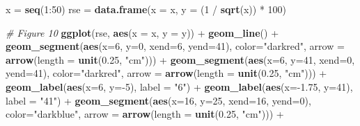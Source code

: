 \documentclass[]{book}
\newenvironment{Shaded}{\begin{snugshade}}{\end{snugshade}}
\newcommand{\KeywordTok}[1]{\textcolor[rgb]{0.13,0.29,0.53}{\textbf{{#1}}}}
\newcommand{\DataTypeTok}[1]{\textcolor[rgb]{0.13,0.29,0.53}{{#1}}}
\newcommand{\DecValTok}[1]{\textcolor[rgb]{0.00,0.00,0.81}{{#1}}}
\newcommand{\FloatTok}[1]{\textcolor[rgb]{0.00,0.00,0.81}{{#1}}}
\newcommand{\StringTok}[1]{\textcolor[rgb]{0.31,0.60,0.02}{{#1}}}
\newcommand{\CommentTok}[1]{\textcolor[rgb]{0.56,0.35,0.01}{\textit{{#1}}}}
\newcommand{\NormalTok}[1]{{#1}}
\begin{document}
\begin{Shaded}
\begin{Highlighting}[]
\NormalTok{x =}\StringTok{ }\KeywordTok{seq}\NormalTok{(}\DecValTok{1}\NormalTok{:}\DecValTok{50}\NormalTok{)}
\NormalTok{rse =}\StringTok{ }\KeywordTok{data.frame}\NormalTok{(}\DataTypeTok{x =} \NormalTok{x, }\DataTypeTok{y =} \NormalTok{(}\DecValTok{1} \NormalTok{/}\StringTok{ }\KeywordTok{sqrt}\NormalTok{(x)) *}\StringTok{ }\DecValTok{100}\NormalTok{)}

\CommentTok{# Figure 10}
\KeywordTok{ggplot}\NormalTok{(rse, }\KeywordTok{aes}\NormalTok{(}\DataTypeTok{x =} \NormalTok{x, }\DataTypeTok{y =} \NormalTok{y)) +}
\StringTok{  }\KeywordTok{geom_line}\NormalTok{() +}
\StringTok{  }\KeywordTok{geom_segment}\NormalTok{(}\KeywordTok{aes}\NormalTok{(}\DataTypeTok{x=}\DecValTok{6}\NormalTok{, }\DataTypeTok{y=}\DecValTok{0}\NormalTok{, }\DataTypeTok{xend=}\DecValTok{6}\NormalTok{, }\DataTypeTok{yend=}\DecValTok{41}\NormalTok{), }\DataTypeTok{color=}\StringTok{"darkred"}\NormalTok{, }\DataTypeTok{arrow =} \KeywordTok{arrow}\NormalTok{(}\DataTypeTok{length =} \KeywordTok{unit}\NormalTok{(}\FloatTok{0.25}\NormalTok{, }\StringTok{"cm"}\NormalTok{))) +}
\StringTok{  }\KeywordTok{geom_segment}\NormalTok{(}\KeywordTok{aes}\NormalTok{(}\DataTypeTok{x=}\DecValTok{6}\NormalTok{, }\DataTypeTok{y=}\DecValTok{41}\NormalTok{, }\DataTypeTok{xend=}\DecValTok{0}\NormalTok{, }\DataTypeTok{yend=}\DecValTok{41}\NormalTok{), }\DataTypeTok{color=}\StringTok{"darkred"}\NormalTok{, }\DataTypeTok{arrow =} \KeywordTok{arrow}\NormalTok{(}\DataTypeTok{length =} \KeywordTok{unit}\NormalTok{(}\FloatTok{0.25}\NormalTok{, }\StringTok{"cm"}\NormalTok{))) +}
\StringTok{  }\KeywordTok{geom_label}\NormalTok{(}\KeywordTok{aes}\NormalTok{(}\DataTypeTok{x=}\DecValTok{6}\NormalTok{, }\DataTypeTok{y=}\NormalTok{-}\DecValTok{5}\NormalTok{), }\DataTypeTok{label =} \StringTok{"6"}\NormalTok{) +}
\StringTok{  }\KeywordTok{geom_label}\NormalTok{(}\KeywordTok{aes}\NormalTok{(}\DataTypeTok{x=}\NormalTok{-}\FloatTok{1.75}\NormalTok{, }\DataTypeTok{y=}\DecValTok{41}\NormalTok{), }\DataTypeTok{label =} \StringTok{"41"}\NormalTok{) +}
\StringTok{  }\KeywordTok{geom_segment}\NormalTok{(}\KeywordTok{aes}\NormalTok{(}\DataTypeTok{x=}\DecValTok{16}\NormalTok{, }\DataTypeTok{y=}\DecValTok{25}\NormalTok{, }\DataTypeTok{xend=}\DecValTok{16}\NormalTok{, }\DataTypeTok{yend=}\DecValTok{0}\NormalTok{), }\DataTypeTok{color=}\StringTok{"darkblue"}\NormalTok{, }\DataTypeTok{arrow =} \KeywordTok{arrow}\NormalTok{(}\DataTypeTok{length =} \KeywordTok{unit}\NormalTok{(}\FloatTok{0.25}\NormalTok{, }\StringTok{"cm"}\NormalTok{))) +}

\end{Highlighting}
\end{Shaded}
\end{document}
